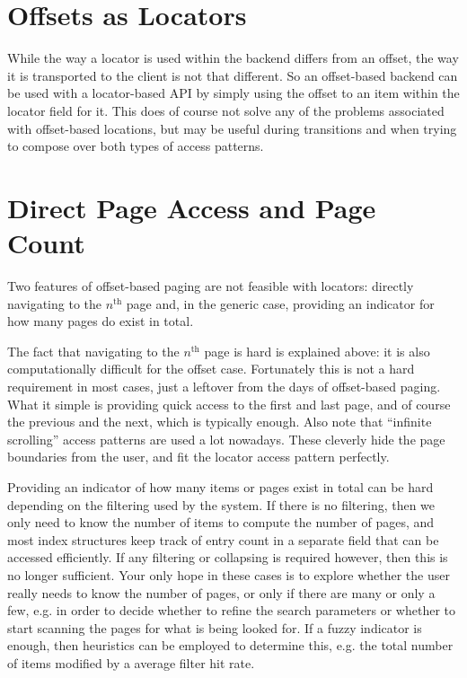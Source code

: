\documentclass[11pt,a4paper]{article}
\begin{document}
\begin{multicols*}{2}
\section*{Offsets as Locators}

While the way a locator is used within the backend differs from an offset, the
way it is transported to the client is not that different. So an offset-based
backend can be used with a locator-based API by simply using the offset to an
item within the locator field for it. This does of course not solve any of the
problems associated with offset-based locations, but may be useful during
transitions and when trying to compose over both types of access patterns.

\section*{Direct Page Access and Page Count}

Two features of offset-based paging are not feasible with locators: directly
navigating to the $n^\textrm{th}$ page and, in the generic case, providing an indicator for how many
pages do exist in total. 

The fact that navigating to the $n^\textrm{th}$ page is hard is explained above:
it is also computationally difficult for the offset case. Fortunately this is not a hard requirement
in most cases, just a leftover from the days of offset-based paging. What it
simple is providing quick access to the first and last page, and of course the
previous and the next, which is typically enough. Also note that ``infinite
scrolling'' access patterns are used a lot nowadays. These cleverly hide the
page boundaries from the user, and fit the locator access pattern perfectly.

Providing an indicator of how many items or pages exist in total can be hard
depending on the filtering used by the system. If there is no filtering, then we
only need to know the number of items to compute the number of pages, and most
index structures keep track of entry count in a separate field that can be
accessed efficiently. If any filtering or collapsing is required however, then
this is no longer sufficient. Your only hope in these cases is to explore
whether the user really needs to know the number of pages, or only if there are
many or only a few, e.g. in order to decide whether to refine the search
parameters or whether to start scanning the pages for what is being looked for.
If a fuzzy indicator is enough, then heuristics can be employed to determine
this, e.g. the total number of items modified by a average filter hit rate.


\end{multicols*}
\end{document}
